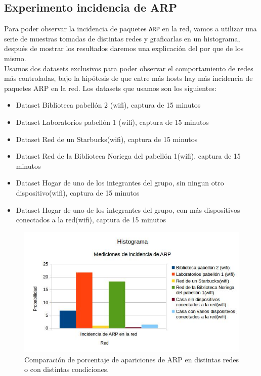 
\subsection{Experimento incidencia de ARP}

Para poder observar la incidencia de paquetes \texttt{ARP} en la red, vamos a utilizar una serie de muestras tomadas de distintas redes y graficarlas en un histograma,
después de mostrar los resultados daremos una explicación del por que de los mismo.\\

Usamos dos datasets exclusivos para poder observar el comportamiento de redes más controladas, bajo la hipótesis de que entre más hosts hay más incidencia de paquetes ARP
en la red. Los datasets que usamos son los siguientes:\\

\begin{itemize}
    \item Dataset Biblioteca pabellón 2 (wifi), captura de 15 minutos
    \item Dataset Laboratorios pabellón 1 (wifi), captura de 15 minutos
    \item Dataset Red de un Starbucks(wifi), captura de 15 minutos
    \item Dataset Red de la Biblioteca Noriega del pabellón 1(wifi), captura de 15 minutos
    \item Dataset Hogar de uno de los integrantes del grupo, sin ningun otro dispositivo(wifi), captura de 15 minutos
    \item Dataset Hogar de uno de los integrantes del grupo, con más dispositivos conectados a la red(wifi), captura de 15 minutos
\end{itemize}

\begin{figure}[H]
\centering
\includegraphics[width=150mm]{imagenes/IncidenciaARP.jpg}
\caption{Comparación de porcentaje de apariciones de ARP en distintas redes o con distintas condiciones.\label{overflow}}
\end{figure}

